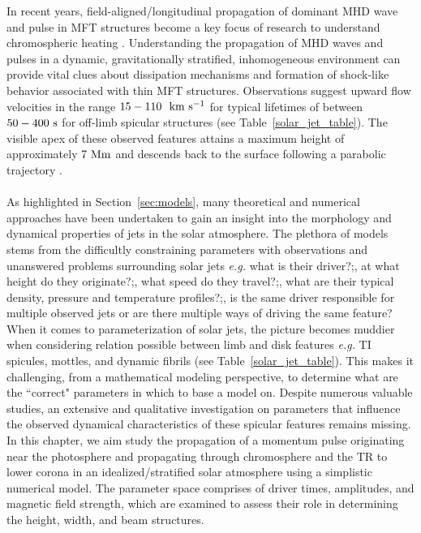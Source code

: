 \documentclass[12pt]{ociamthesis}
\newcommand{\kms}{~\rm{km ~s^{-1}}}
\newcommand{\np}{\\ \\}
\begin{document}
%
%
%
In recent years, field-aligned/longitudinal propagation of dominant MHD wave and pulse in MFT structures become a key focus of research to understand chromospheric heating \citep{Narain1990, Zaqarashvili_2009SSRv, Jess2015}. Understanding the propagation of MHD waves and pulses in a dynamic, gravitationally stratified, inhomogeneous environment can provide vital clues about dissipation mechanisms and formation of shock-like behavior associated with thin MFT structures. Observations suggest upward flow velocities in the range $15-110 ~\kms$ for typical lifetimes of between $50-400~\rm{s}$ for off-limb spicular structures (see Table~\ref{solar_jet_table}). The visible apex of these observed features attains a maximum height of approximately $7~\rm{Mm}$ and descends back to the surface following a parabolic trajectory \citep{Pereira2012,Pereira2016ApJ82465P}. \np
%
As highlighted in Section~\ref{sec:models}, many theoretical and numerical approaches have been undertaken to gain an insight into the morphology and dynamical properties of jets in the solar atmosphere. The plethora of models stems from the difficultly constraining parameters with observations and unanswered problems surrounding solar jets \textit{e.g.} what is their driver?;, at what height do they originate?;, what speed do they travel?;, what are their typical density, pressure and temperature profiles?;, is the same driver responsible for multiple observed jets or are there multiple ways of driving the same feature? When it comes to parameterization of solar jets, the picture becomes muddier when considering relation possible between limb and disk features \textit{e.g.} TI spicules, mottles, and dynamic fibrils (see Table~\ref{solar_jet_table}). This makes it challenging, from a mathematical modeling perspective, to determine what are the ``correct" parameters in which to base a model on. Despite numerous valuable studies, an extensive and qualitative investigation on parameters that influence the observed dynamical characteristics of these spicular features remains missing. In this chapter, we aim study the propagation of a momentum pulse originating near the photosphere and propagating through chromosphere and the TR to lower corona in an idealized/stratified solar atmosphere using a simplistic numerical model. The parameter space comprises of driver times, amplitudes, and magnetic field strength, which are examined to assess their role in determining the height, width, and beam structures.
\end{document}
